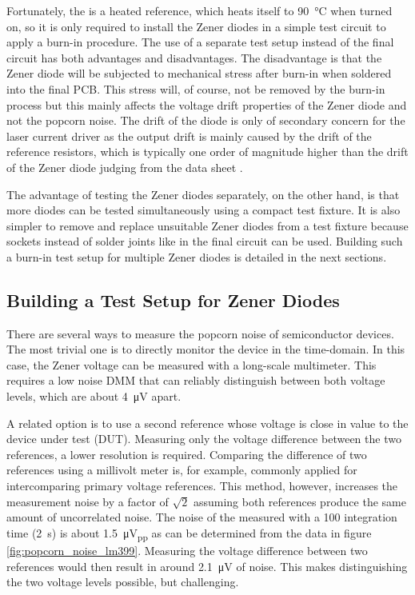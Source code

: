 Fortunately, the  is a heated reference, which heats itself to \qty{90}{\celsius} when turned on, so it is only required to install the Zener diodes in a simple test circuit to apply a burn-in procedure. The use of a separate test setup instead of the final circuit has both advantages and disadvantages. The disadvantage is that the Zener diode will be subjected to mechanical stress after burn-in when soldered into the final PCB. This stress will, of course, not be removed by the burn-in process but this mainly affects the voltage drift properties of the Zener diode and not the popcorn noise. The drift of the diode is only of secondary concern for the laser current driver as the output drift is mainly caused by the drift of the reference resistors, which is typically one order of magnitude higher than the drift of the Zener diode judging from the data sheet \cite{datasheet_LM399,datasheet_VPR}.

The advantage of testing the Zener diodes separately, on the other hand, is that more diodes can be tested simultaneously using a compact test fixture. It is also simpler to remove and replace unsuitable Zener diodes from a test fixture because sockets instead of solder joints like in the final circuit can be used. Building such a burn-in test setup for multiple Zener diodes is detailed in the next sections.

\subsection{Building a Test Setup for Zener Diodes}
There are several ways to measure the popcorn noise of semiconductor devices. The most trivial one is to directly monitor the device in the time-domain. In this case, the Zener voltage can be measured with a long-scale multimeter. This requires a low noise DMM that can reliably distinguish between both voltage levels, which are about \qty{4}{\micro \volt} apart.

A related option is to use a second reference whose voltage is close in value to the device under test (DUT). Measuring only the voltage difference between the two references, a lower resolution is required. Comparing the difference of two references using a millivolt meter is, for example, commonly applied for intercomparing primary voltage references. This method, however, increases the measurement noise by a factor of $\sqrt{2}$ assuming both references produce the same amount of uncorrelated noise. The noise of the  measured with a \qty{100}{\plc} integration time (\qty{2}{\second}) is about \qty{1.5}{\micro \volt_{pp}} as can be determined from the data in figure \ref{fig:popcorn_noise_lm399}. Measuring the voltage difference between two references would then result in around \qty{2.1}{\micro \volt} of noise. This makes distinguishing the two voltage levels possible, but challenging.

